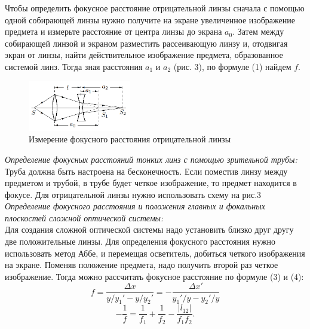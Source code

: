 \documentclass[a4paper, 12pt]{article}%
\newcommand{\RomanNumeralCaps}[1]{\uppercase\expandafter{\romannumeral#1}}
\begin{document}
	Чтобы определить фокусное расстояние отрицательной линзы сначала с
	помощью одной собирающей линзы нужно получите на экране увеличенное изображение предмета и измерьте расстояние от центра линзы до экрана $a_0$.
	Затем между собирающей линзой и экраном разместить рассеивающую линзу и,
	отодвигая экран от линзы, найти действительное изображение предмета, образованное системой линз. Тогда зная расстояния $a_1$ и $a_2$ (рис. 3), по формуле (1) найдем $f$.
	
	 \begin{figure}[H]
	 	\begin{center}
	 		\includegraphics[width = 0.4\textwidth]{3.png}
	 		\caption{Измерение фокусного расстояния отрицательной линзы}
	 	\end{center}
	 \end{figure}
 
 	\RomanNumeralCaps 2 \textit{Определение фокусных расстояний тонких линз с помощью зрительной трубы:}\\
 	
 	Труба должна быть настроена на бесконечность. Если поместив линзу между предметом и трубой, в трубе будет четкое изображение, то предмет находится в фокусе. Для отрицательной линзы нужно использовать схему на рис.3\\
 	
 	\RomanNumeralCaps 3 \textit{Определение фокусного расстояния и положения главных и фокальных плоскостей сложной оптической системы:}\\
 	
 		Для создания сложной оптической системы надо установить близко друг другу две положительные линзы. Для определения фокусного расстояния нужно использовать метод Аббе, и перемещая осветитель, добиться четкого изображения на экране. Поменяв положение предмета, надо получить второй раз четкое изображение. Тогда можно рассчитать фокусное расстояние по формуле (3) и (4):
 		 	\begin{equation}
 		 	f = \frac{\Delta x}{y/y_1' - y/y_2'} = -\frac{\Delta x'}{y_1'/y - y_2'/y}
 		 \end{equation}
 	 \begin{equation}
 	 	-\frac{1}{f} = \frac{1}{f_1} + \frac{1}{f_2} - \frac{|l_12|}{f_1 f_2}.
 	 \end{equation}
  
\end{document}
